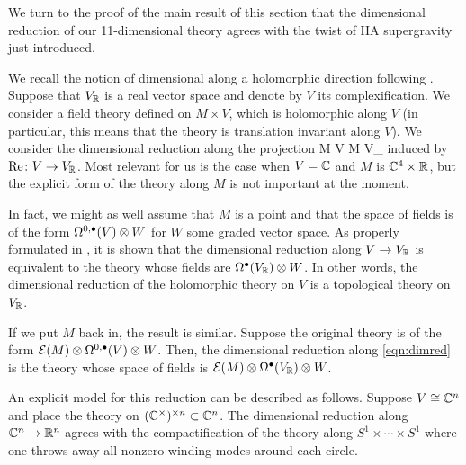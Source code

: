 
We turn to the proof of the main result of this section that the dimensional reduction of our 11-dimensional theory agrees with the twist of IIA supergravity just introduced. 

We recall the notion of dimensional along a holomorphic direction following \cite{ESW}. 
Suppose that $V_\mathbb R$ is a real vector space and denote by $V$ its complexification. 
We consider a field theory defined on $M \times V$, which is holomorphic along $V$ (in particular, this means that the theory is translation invariant along $V$).  
We consider the dimensional reduction along the projection 
\beqn\label{eqn:dimred}
M \times V \to M \times V_\RR
\eeqn
induced by ${\rm Re} \colon V \to V_\mathbb R$.
Most relevant for us is the case when $V = \mathbb C$ and $M$ is $\mathbb C^4 \times \mathbb R$, but the explicit form of the theory along $M$ is not important at the moment.

In fact, we might as well assume that $M$ is a point and that the space of fields is of the form $\Omega^{0,\bullet}(V) \otimes W$ for $W$ some graded vector space. 
As properly formulated in \cite{ESW}, it is shown that the dimensional reduction along $V \to V_\mathbb R$ is equivalent to the theory whose fields are $\Omega^\bullet(V_\mathbb R) \otimes W$. 
In other words, the dimensional reduction of the holomorphic theory on $V$ is a topological theory on $V_\mathbb R$. 

If we put $M$ back in, the result is similar. 
Suppose the original theory is of the form $\mathcal E(M) \otimes \Omega^{0,\bullet}(V) \otimes W$.
Then, the dimensional reduction along \eqref{eqn:dimred} is the theory whose space of fields is $\mathcal E(M) \otimes \Omega^\bullet(V_\mathbb R) \otimes W$.

An explicit model for this reduction can be described as follows. 
Suppose $V \cong \mathbb C^n$ and place the theory on $(\mathbb C^\times)^{\times n} \subset \mathbb C^n$. 
The dimensional reduction along $\mathbb C^n \to \mathbb R^n$ agrees with the compactification of the theory along $S^1 \times \cdots \times S^1$ where one throws away all nonzero winding modes around each circle.

